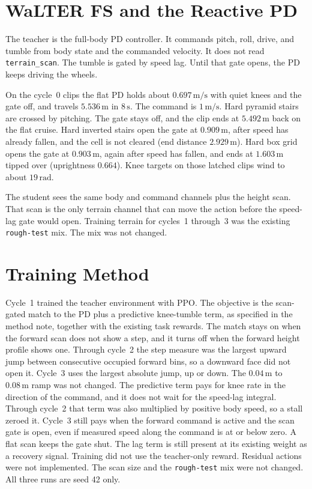 \documentclass[11pt]{article}
\begin{document}
\section{WaLTER FS and the Reactive PD}
\label{sec:walter}

The teacher is the full-body PD controller.
It commands pitch, roll, drive, and tumble from body state and the commanded velocity.
It does not read \texttt{terrain\_scan}.
The tumble is gated by speed lag.
Until that gate opens, the PD keeps driving the wheels.

On the cycle~0 clips the flat PD holds about \(0.697\,\mathrm{m/s}\) with quiet knees and the gate off, and travels \(5.536\,\mathrm{m}\) in \(8\,\mathrm{s}\).
The command is \(1\,\mathrm{m/s}\).
Hard pyramid stairs are crossed by pitching.
The gate stays off, and the clip ends at \(5.492\,\mathrm{m}\) back on the flat cruise.
Hard inverted stairs open the gate at \(0.909\,\mathrm{m}\), after speed has already fallen, and the cell is not cleared (end distance \(2.929\,\mathrm{m}\)).
Hard box grid opens the gate at \(0.903\,\mathrm{m}\), again after speed has fallen, and ends at \(1.603\,\mathrm{m}\) tipped over (uprightness \(0.664\)).
Knee targets on those latched clips wind to about \(19\,\mathrm{rad}\).

The student sees the same body and command channels plus the height scan.
That scan is the only terrain channel that can move the action before the speed-lag gate would open.
Training terrain for cycles~1 through~3 was the existing \texttt{rough-test} mix.
The mix was not changed.

\section{Training Method}
\label{sec:method}

Cycle~1 trained the teacher environment with PPO.
The objective is the scan-gated match to the PD plus a predictive knee-tumble term, as specified in the method note, together with the existing task rewards.
The match stays on when the forward scan does not show a step, and it turns off when the forward height profile shows one.
Through cycle~2 the step measure was the largest upward jump between consecutive occupied forward bins, so a downward face did not open it.
Cycle~3 uses the largest absolute jump, up or down.
The \(0.04\,\mathrm{m}\) to \(0.08\,\mathrm{m}\) ramp was not changed.
The predictive term pays for knee rate in the direction of the command, and it does not wait for the speed-lag integral.
Through cycle~2 that term was also multiplied by positive body speed, so a stall zeroed it.
Cycle~3 still pays when the forward command is active and the scan gate is open, even if measured speed along the command is at or below zero.
A flat scan keeps the gate shut.
The lag term is still present at its existing weight as a recovery signal.
Training did not use the teacher-only reward.
Residual actions were not implemented.
The scan size and the \texttt{rough-test} mix were not changed.
All three runs are seed 42 only.
\end{document}
